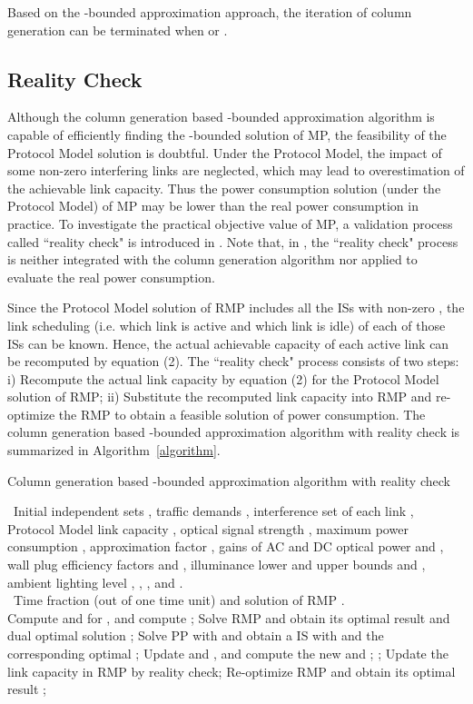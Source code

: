 \documentclass[10pt,journal]{IEEEtran}
\begin{document}
Based on the -bounded approximation approach, the iteration of column generation can be terminated when  or .

\subsection{Reality Check}
Although the column generation based -bounded approximation algorithm is capable of efficiently finding the -bounded solution of MP, the feasibility of the Protocol Model solution is doubtful. Under the Protocol Model, the impact of some non-zero interfering links are neglected, which may lead to overestimation of the achievable link capacity. Thus the power consumption solution (under the Protocol Model) of MP may be lower than the real power consumption in practice. To investigate the practical objective value of MP, a validation process called ``reality check" is introduced in \cite{shi2013bridging}. Note that, in \cite{shi2013bridging}, the ``reality check" process is neither integrated with the column generation algorithm nor applied to evaluate the real power consumption.

Since the Protocol Model solution of RMP includes all the ISs with non-zero , the link scheduling (i.e. which link is active and which link is idle) of each of those ISs can be known. Hence, the actual achievable capacity of each active link can be recomputed by equation (2). The ``reality check" process consists of two steps: i) Recompute the actual link capacity by equation (2) for the Protocol Model solution of RMP; ii) Substitute the recomputed link capacity into RMP and re-optimize the RMP to obtain a feasible solution of power consumption. The column generation based -bounded approximation algorithm with reality check is summarized in Algorithm~\ref{algorithm}.


\begin{algorithm}
\caption{Column generation based -bounded approximation algorithm with reality check}\label{algorithm}
\begin{algorithmic}[1]
\REQUIRE~Initial independent sets , traffic demands , interference set of each link , Protocol Model link capacity , optical signal strength , maximum power consumption , approximation factor , gains of AC and DC optical power  and , wall plug efficiency factors  and , illuminance lower and upper bounds  and , ambient lighting level , , ,  and .\\
\ENSURE~Time fraction (out of one time unit)  and solution of RMP .\\
\STATE Compute  and  for , and compute ;
\STATE Solve RMP and obtain its optimal result  and dual optimal solution ;
\STATE Solve PP with  and obtain a IS  with  and the corresponding optimal ;
\STATE Update  and , and compute the new  and ;
\STATE ;
\ENDWHILE
\STATE Update the link capacity in RMP by reality check;
\STATE Re-optimize RMP and obtain its optimal result ;
\end{algorithmic}
\end{algorithm}
\end{document}

